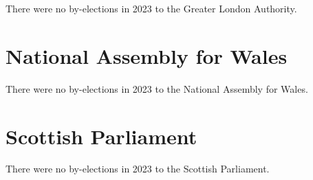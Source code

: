 \documentclass[a4paper,openany]{book}
\begin{document}
There were no by-elections in 2023 to the Greater London Authority.


\section{National Assembly for Wales}

There were no by-elections in 2023 to the National Assembly for Wales.


\section{Scottish Parliament}

There were no by-elections in 2023 to the Scottish Parliament.

%
%
%

%
%
\end{document}
